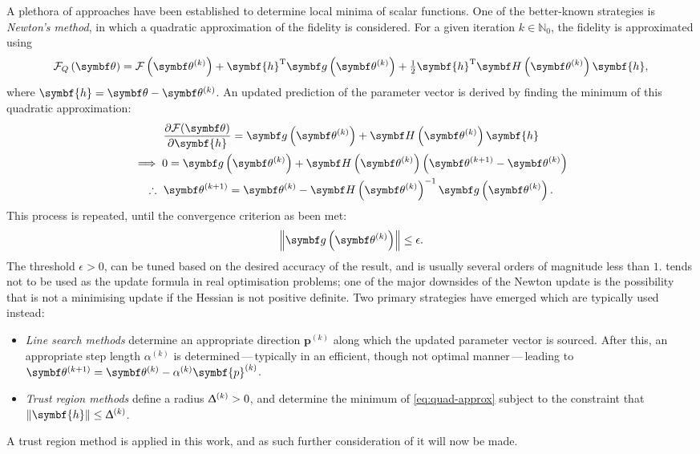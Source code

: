 A plethora of approaches have been established to determine local minima of
scalar functions. One of the better-known strategies is \emph{Newton's method},
in which a quadratic approximation of the fidelity is considered.
For a given iteration $k \in \mathbb{N}_0$, the fidelity is approximated using
\begin{equation}
    \FQth =
        \Fthk +
        \symbf{h}\T \bdgthk +
        \tfrac{1}{2} \symbf{h}^{\mathrm{T}} \bdHthk \symbf{h},
    \label{eq:quad-approx}
\end{equation}
where $\symbf{h} = \bth - \bthk$.  An updated prediction of the parameter
vector is derived by finding the minimum of this quadratic approximation:
\begin{gather}
    \frac{\partial \Fth}{\partial \symbf{h}} =
        \bdgthk + \bdHthk \symbf{h} \notag\\
    \implies 0 = \bdgthk + \bdHthk \left(\bthkplusone - \bthk\right) \notag\\
    \therefore\ \bthkplusone =
        \bthk - \bdHthk^{-1}
        \bdgthk.\label{eq:newton-update}
\end{gather}
This process is repeated, until the convergence criterion as been met:
\begin{equation}
    \left\lVert \bdgthk \right\rVert \leq \epsilon.
\end{equation}
The threshold $\epsilon > 0$, can be tuned based on the desired accuracy of the
result, and is usually several orders of magnitude less than $1$.
 tends not to be used as the update formula in real
optimisation problems; one of the major downsides of the Newton update is the
possibility that is not a minimising update if the Hessian is not positive
definite. Two primary strategies have emerged which are typically used instead:
\begin{itemize}
    \item \emph{Line search methods}\cite[Chapter 3]{Nocedal2006} determine an
        appropriate direction $\symbf{p}^{(k)}$ along which the updated
        parameter vector is sourced.  After this, an appropriate step length
        $\alpha^{(k)}$ is determined\,---\,typically in an efficient, though not
        optimal manner\,---\,leading to $\bthkplusone = \bthk - \alpha^{(k)}\symbf{p}^{(k)}$.
    \item \emph{Trust region methods}\cite[Chapter 4]{Nocedal2006} define a
        radius $\Updelta^{(k)} > 0$, and determine the minimum of
        \cref{eq:quad-approx} subject to the constraint that
        $\left\lVert\symbf{h}\right\rVert \leq \Updelta^{(k)}$.
\end{itemize}
A trust region method is applied in this work, and as such further
consideration of it will now be made.

